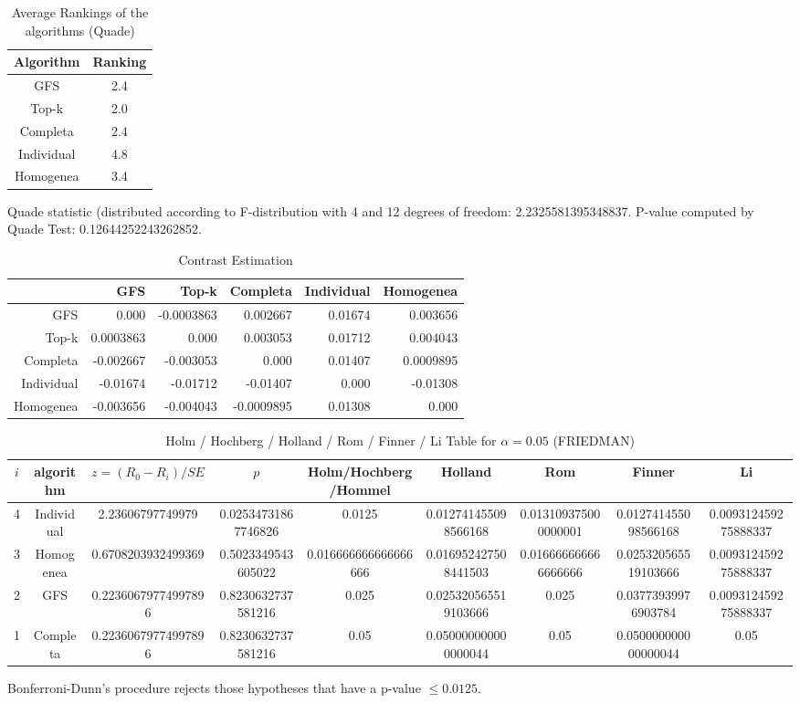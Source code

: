 \documentclass[a4paper,10pt]{article}
\begin{document}
\begin{landscape}
\newpage

\begin{table}[!htp]
\centering
\caption{Average Rankings of the algorithms (Quade)
}\begin{tabular}{c|c}
Algorithm&Ranking\\
\hline
GFS&2.4\\
Top-k&2.0\\
Completa&2.4\\
Individual&4.8\\
Homogenea&3.4\\
\end{tabular}
\end{table}
Quade statistic (distributed according to F-distribution with 4 and 12 degrees of freedom: 2.2325581395348837. 
P-value computed by Quade Test: 0.12644252243262852.\newline


\newpage

\begin{table}[!htp]
\centering\tiny
\caption{Contrast Estimation}
\begin{tabular}{
|r|r|r|r|r|r|}
\hline
 &GFS&Top-k&Completa&Individual&Homogenea\\
\hline
GFS&0.000&-0.0003863&0.002667&0.01674&0.003656\\
\hline
Top-k&0.0003863&0.000&0.003053&0.01712&0.004043\\
\hline
Completa&-0.002667&-0.003053&0.000&0.01407&0.0009895\\
\hline
Individual&-0.01674&-0.01712&-0.01407&0.000&-0.01308\\
\hline
Homogenea&-0.003656&-0.004043&-0.0009895&0.01308&0.000\\
\hline

\end{tabular}
\end{table}

\newpage

\begin{table}[!htp]
\centering\scriptsize
\caption{Holm / Hochberg / Holland / Rom / Finner / Li Table for $\alpha=0.05$ (FRIEDMAN)}
\begin{tabular}{ccccccccc}
$i$&algorithm&$z=(R_0 - R_i)/SE$&$p$&Holm/Hochberg/Hommel&Holland&Rom&Finner&Li\\
\hline
4&Individual&2.23606797749979&0.02534731867746826&0.0125&0.012741455098566168&0.013109375000000001&0.012741455098566168&0.009312459275888337\\
3&Homogenea&0.6708203932499369&0.5023349543605022&0.016666666666666666&0.016952427508441503&0.016666666666666666&0.025320565519103666&0.009312459275888337\\
2&GFS&0.22360679774997896&0.8230632737581216&0.025&0.025320565519103666&0.025&0.03773939976903784&0.009312459275888337\\
1&Completa&0.22360679774997896&0.8230632737581216&0.05&0.050000000000000044&0.05&0.050000000000000044&0.05\\
\hline
\end{tabular}
\end{table}
Bonferroni-Dunn's procedure rejects those hypotheses that have a p-value $\le0.0125$.



\end{landscape}
\end{document}
